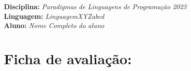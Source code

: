 



\noindent
\textbf{Disciplina:} \textit{Paradigmas de Linguagens de Programa\c{c}\~{a}o 2023}\\
\textbf{Linguagem:} \textit{LinguagemXYZabcd}\\
\textbf{Aluno:} \textit{ \color{blue} Nome Completo do aluno}


\section*{Ficha de avalia\c{c}\~{a}o:}




